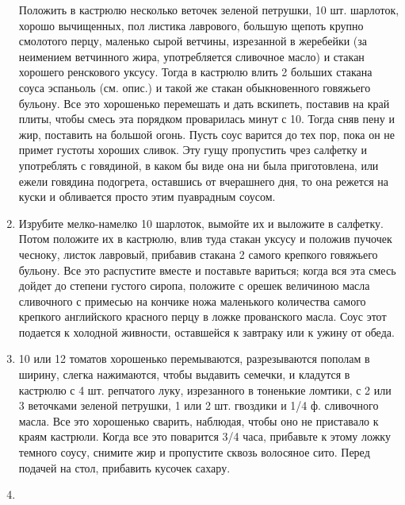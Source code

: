 \begin{enumerate}
Положить в кастрюлю несколько веточек зеленой петрушки, 10 шт. шарлоток, хорошо вычищенных, пол листика лаврового, большую щепоть крупно смолотого перцу, маленько сырой ветчины, изрезанной в жеребейки (за неимением ветчинного жира, употребляется сливочное масло) и стакан хорошего ренскового уксусу. Тогда в кастрюлю влить 2 больших стакана соуса эспаньоль (см. опис.) и такой же стакан обыкновенного говяжьего бульону. Все это хорошенько перемешать и дать вскипеть, поставив на край плиты, чтобы смесь эта порядком проварилась минут с 10. Тогда сняв пену и жир, поставить на большой огонь. Пусть соус варится до тех пор, пока он не примет густоты хороших сливок. Эту гущу пропустить чрез салфетку и употреблять с говядиной, в каком бы виде она ни была приготовлена, или ежели говядина подогрета, оставшись от вчерашнего дня, то она режется на куски и обливается просто этим пуаврадным соусом.

	\item {}

Изрубите мелко-намелко 10 шарлоток, вымойте их и выложите в салфетку. Потом положите их в кастрюлю, влив туда стакан уксусу и положив пучочек чесноку, листок лавровый, прибавив стакана 2 самого крепкого говяжьего бульону. Все это распустите вместе и поставьте вариться; когда вся эта смесь дойдет до степени густого сиропа, положите с орешек величиною масла сливочного с примесью на кончике ножа маленького количества самого крепкого английского красного перцу в ложке прованского масла. Соус этот подается к холодной живности, оставшейся к завтраку или к ужину от обеда.

	\item {}

10 или 12 томатов хорошенько перемываются, разрезываются пополам в ширину, слегка нажимаются, чтобы выдавить семечки, и кладутся в кастрюлю с 4 шт. репчатого луку, изрезанного в тоненькие ломтики, с 2 или 3 веточками зеленой петрушки, 1 или 2 шт. гвоздики и 1/4 ф. сливочного масла. Все это хорошенько сварить, наблюдая, чтобы оно не приставало к краям кастрюли. Когда все это поварится 3/4 часа, прибавьте к этому ложку темного соусу, снимите жир и пропустите сквозь волосяное сито. Перед подачей на стол, прибавить кусочек сахару.

	\item {}


\end{enumerate}
